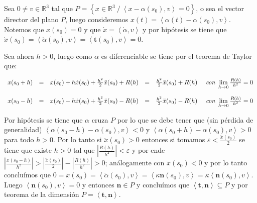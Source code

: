 \documentclass[11pt]{article}
\newcommand{\R}{{\mathbb{R}}}
\newcommand\abs[1]{\left\lvert#1\right\rvert}
\newcommand\ip[1]{\left\langle#1\right\rangle}
\renewcommand\tt{\mathbf{t}}
\newcommand\nn{\mathbf{n}}
\newcommand{\sett}[1]{\left\lbrace#1\right\rbrace}
\newenvironment{proof}[1][Demostraci\'on]{\begin{trivlist}
		\item[\hskip \labelsep {\bfseries #1}]}{\end{trivlist}}
\newcommand{\qed}{\nobreak \ifvmode \relax \else
	\ifdim\lastskip<1.5em \hskip-\lastskip
	\hskip1.5em plus0em minus0.5em \fi \nobreak
	\vrule height0.75em width0.5em depth0.25em\fi}
\begin{document}
\begin{enumerate}
	\label{Ejercicio 16}
	
	\begin{proof}
		
		Sea $0 \neq v \in \R^3$ tal que $P = \sett{x \in \R^3 \ / \ \ip{x - \alpha(s_0) , v} = 0}$, o sea el vector director del plano $P$, luego consideremos $x(t) = \ip{\alpha(t) - \alpha(s_0) , v}$. Notemos que $x(s_0) = 0$ y que $\dot{x} = \ip{\dot{\alpha} , v}$ y por hip\'otesis se tiene que $\dot{x}(s_0) = \ip{\dot{\alpha}(s_0) , v} = \ip{\tt (s_0) , v} = 0$.
		
		Sea ahora $h > 0$, luego como $\alpha$ es diferenciable se tiene por el teorema de Taylor que:
		
		\[
		\begin{array}{ccccc}
		x(s_0+h) & = &  x(s_0) + h\dot{x}(s_0) + \frac{h^2}{2} \ddot{x}(s_0) + R(h) & = &  \frac{h^2}{2} \ddot{x}(s_0) + R(h) \quad \emph{ con } \lim\limits_{h \rightarrow 0}{\frac{R(h)}{h^2}} = 0 \\
		\\
		x(s_0-h) & = &  x(s_0) - h\dot{x}(s_0) + \frac{h^2}{2} \ddot{x}(s_0) - R(h) & = &  \frac{h^2}{2} \ddot{x}(s_0) - R(h) \quad \emph{ con } \lim\limits_{h \rightarrow 0}{\frac{R(h)}{h^2}} = 0 
		\end{array}
		\]		
		
		Por hip\'otesis se tiene que $\alpha$ cruza $P$ por lo que se debe tener que (sin p\'erdida de generalidad) $\ip{\alpha(s_0 -h) -\alpha(s_0) , v} < 0$ y $\ip{\alpha(s_0 + h) -\alpha(s_0) , v} > 0$ para todo $h > 0$. Por lo tanto si $\ddot{x}(s_0) > 0$ entonces si tomamos $\varepsilon < \frac{\ddot{x}(s_0)}{2} $ se tiene que existe $h>0$ tal que $\abs{\frac{R(h)}{h^2}} < \varepsilon$ y por ende $	\abs{\frac{x(s_0-h)}{h^2}} > \abs{ \frac{\ddot{x}(s_0)}{2} } - \abs{\frac{R(h)}{h^2}} > 0$; an\'alogamente con $\ddot{x}(s_0)< 0$ y por lo tanto conclu\'imos que $0 = \ddot{x}(s_0) = \ip{\ddot{\alpha}(s_0) , v} = \ip{\kappa \nn(s_0) , v} = \kappa \ip{\nn(s_0) , v}$. Luego $\ip{\nn(s_0) , v} = 0$ y entonces $\nn \in P$ y conclu\'imos que $\ip{\tt , \nn} \subseteq P$ y por teorema de la dimensi\'on $P = \ip{\tt , \nn}$. \qed
		
	\end{proof}
	
	

\end{enumerate}
\end{document}
